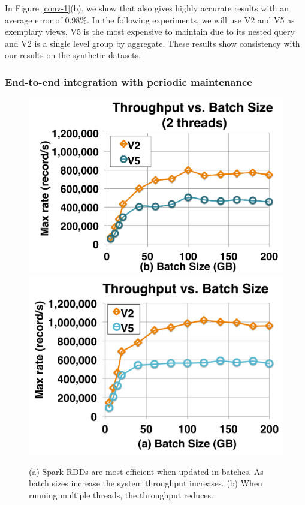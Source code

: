 In Figure \ref{conv-1}(b), we show that \svc also gives highly accurate results with an average error of 0.98\%.
In the following experiments, we will use V2 and V5 as exemplary views.
V5 is the most expensive to maintain due to its nested query and V2 is a single level group by aggregate.
These results show consistency with our results on the synthetic datasets.

\iffalse
\subsubsection{End-to-end integration with periodic maintenance}
\begin{figure}[t]
\centering
 \includegraphics[scale=0.14]{exp/con_1.pdf}
 \includegraphics[scale=0.14]{exp/con_2.pdf}\vspace{-1em}
 \caption{(a) Spark RDDs are most efficient when updated in batches. As batch sizes increase the system throughput increases. (b) When running multiple threads, the throughput reduces. \label{conv-2}}\vspace{-1.25em}
\end{figure}

